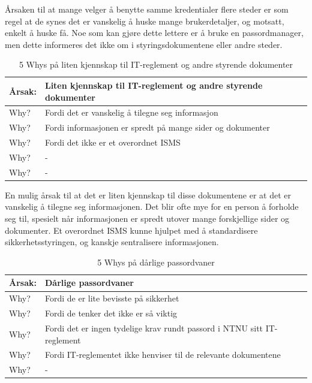 Årsaken til at mange velger å benytte samme kredentialer flere steder er som regel at de synes det er vanskelig å huske mange brukerdetaljer, og motsatt, enkelt å huske få. Noe som kan gjøre dette lettere er å bruke en passordmanager, men dette informeres det ikke om i styringsdokumentene eller andre steder. 

\begin{table} [H]
    \centering
    \begin{tabular}{ | m{5em} | m{30em} | }
        \hline
            \cellcolor{yellow} Årsak: & \cellcolor{yellow} Liten kjennskap til IT-reglement og andre styrende dokumenter \\
        \hline
            Why? & Fordi det er vanskelig å tilegne seg informasjon \\
        \hline
            Why? & Fordi informasjonen er spredt på mange sider og dokumenter \\
        \hline
            Why? & Fordi det ikke er et overordnet ISMS \\
        \hline
            Why? & - \\
        \hline
            Why? & - \\
        \hline
    \end{tabular}
    \caption[5 Whys: Liten kjennskap til IT-reglement og andre styrende dokumenter]{5 Whys på liten kjennskap til IT-reglement og andre styrende dokumenter}
    \label{5Whys-phishing}
\end{table}

En mulig årsak til at det er liten kjennskap til disse dokumentene er at det er vanskelig å tilegne seg informasjonen. Det blir ofte mye for en person å forholde seg til, spesielt når informasjonen er spredt utover mange forskjellige sider og dokumenter. Et overordnet ISMS kunne hjulpet med å standardisere sikkerhetsstyringen, og kanskje sentralisere informasjonen. 

\begin{table} [H]
    \centering
    \begin{tabular}{ | m{5em} | m{30em} | }
        \hline
            \cellcolor{yellow} Årsak: & \cellcolor{yellow} Dårlige passordvaner \\
        \hline
            Why? & Fordi de er lite bevisste på sikkerhet \\
        \hline
            Why? & Fordi de tenker det ikke er så viktig \\
        \hline
            Why? & Fordi det er ingen tydelige krav rundt passord i NTNU sitt IT-reglement \\
        \hline
            Why? & Fordi IT-reglementet ikke henviser til de relevante dokumentene \\
        \hline
            Why? & - \\
        \hline
    \end{tabular}
    \caption[5 Whys: Dårlige passordvaner]{5 Whys på dårlige passordvaner}
    \label{5Whys-passordvaner}
\end{table}

